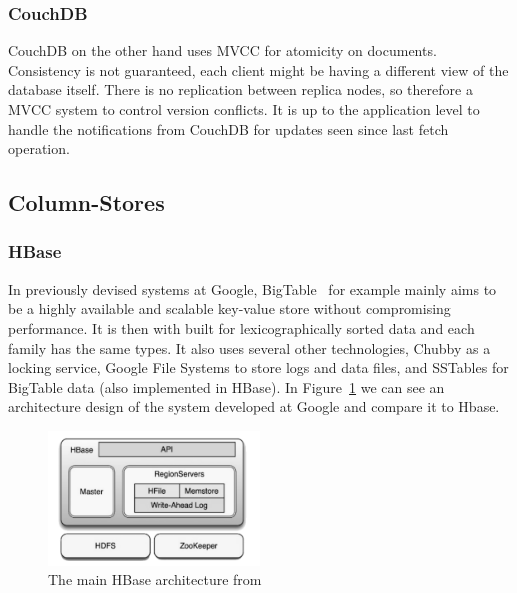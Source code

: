 	\subsubsection{CouchDB}
	CouchDB on the other hand uses MVCC for atomicity on documents. Consistency is not guaranteed, each client might be having a different view of the database itself. There is no replication between replica nodes, so therefore a MVCC system to control version conflicts. It is up to the application level to handle the notifications from CouchDB for updates seen since last fetch operation.
	

\subsection{Column-Stores}
	\subsubsection{HBase}
	In previously devised systems at Google, BigTable~\cite{Chang:2006} for example mainly aims to be a highly available and scalable key-value store without compromising performance. It is then with built for lexicographically sorted data and each family has the same types. It also uses several other technologies, Chubby as a locking service, Google File Systems to store logs and data files, and SSTables for BigTable data (also implemented in HBase). In Figure~\ref{hbase-architecture} we can see an architecture design of the system developed at Google and compare it to Hbase. 


\begin{figure}[h]
\centering
\includegraphics[width=0.5\textwidth]{figs/hbase-main-architecture}
\caption{The main HBase architecture from \protect\cite{SlidesLars}}
\label{hbase-architecture}
\end{figure}


